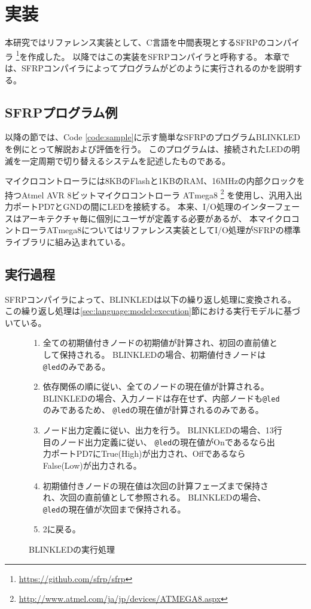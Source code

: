 \chapter{実装}\label{sec:implementation}
本研究ではリファレンス実装として、C言語を中間表現とするSFRPのコンパイラ
\footnote{\url{https://github.com/sfrp/sfrp}}を作成した。
以降ではこの実装をSFRPコンパイラと呼称する。
本章では、SFRPコンパイラによってプログラムがどのように実行されるのかを説明する。

\section{SFRPプログラム例}\label{sec:implementation:example}
以降の節では、Code \ref{code:sample}に示す簡単なSFRPのプログラムBLINKLEDを例にとって解説および評価を行う。
このプログラムは、接続されたLEDの明滅を一定周期で切り替えるシステムを記述したものである。

マイクロコントローラには8KBのFlashと1KBのRAM、16MHzの内部クロックを持つAtmel AVR 8ビットマイクロコントローラ ATmega8
\footnote{\url{http://www.atmel.com/ja/jp/devices/ATMEGA8.aspx}}
を使用し、汎用入出力ポートPD7とGNDの間にLEDを接続する。
本来、I/O処理のインターフェースはアーキテクチャ毎に個別にユーザが定義する必要があるが、
本マイクロコントローラATmega8についてはリファレンス実装としてI/O処理がSFRPの標準ライブラリに組み込まれている。

\newpage



\section{実行過程}\label{sec:implementation:execution}
SFRPコンパイラによって、BLINKLEDは以下の繰り返し処理に変換される。
この繰り返し処理は\ref{sec:language:model:execution}節における実行モデルに基づいている。
\begin{figure}[h]
\begin{screen}
\begin{enumerate}
  \item 全ての初期値付きノードの初期値が計算され、初回の直前値として保持される。
    BLINKLEDの場合、初期値付きノードは\texttt{@led}のみである。
  \item 依存関係の順に従い、全てのノードの現在値が計算される。
    BLINKLEDの場合、入力ノードは存在せず、内部ノードも\texttt{@led}のみであるため、
    \texttt{@led}の現在値が計算されるのみである。
  \item ノード出力定義に従い、出力を行う。
    BLINKLEDの場合、13行目のノード出力定義に従い、
    \texttt{@led}の現在値がOnであるなら出力ポートPD7にTrue(High)が出力され、OffであるならFalse(Low)が出力される。
  \item 初期値付きノードの現在値は次回の計算フェーズまで保持され、次回の直前値として参照される。
    BLINKLEDの場合、\texttt{@led}の現在値が次回まで保持される。
  \item 2に戻る。
\end{enumerate}
\end{screen}
\caption{BLINKLEDの実行処理}
\label{fig:imp:exec}
\end{figure}

